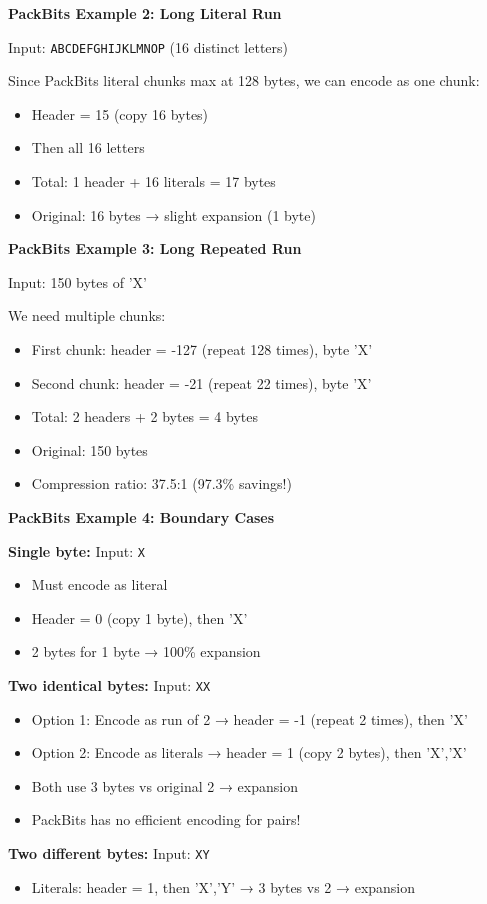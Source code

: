 \begin{examplebox}
\textbf{PackBits Example 2: Long Literal Run}

Input: \texttt{ABCDEFGHIJKLMNOP} (16 distinct letters)

Since PackBits literal chunks max at 128 bytes, we can encode as one chunk:
\begin{itemize}
    \item Header = 15 (copy 16 bytes)
    \item Then all 16 letters
    \item Total: 1 header + 16 literals = 17 bytes
    \item Original: 16 bytes → slight expansion (1 byte)
\end{itemize}
\end{examplebox}

\begin{examplebox}
\textbf{PackBits Example 3: Long Repeated Run}

Input: 150 bytes of 'X'

We need multiple chunks:
\begin{itemize}
    \item First chunk: header = -127 (repeat 128 times), byte 'X'
    \item Second chunk: header = -21 (repeat 22 times), byte 'X'
    \item Total: 2 headers + 2 bytes = 4 bytes
    \item Original: 150 bytes
    \item Compression ratio: 37.5:1 (97.3\% savings!)
\end{itemize}
\end{examplebox}

\begin{examplebox}
\textbf{PackBits Example 4: Boundary Cases}

\textbf{Single byte:} Input: \texttt{X}
\begin{itemize}
    \item Must encode as literal
    \item Header = 0 (copy 1 byte), then 'X'
    \item 2 bytes for 1 byte → 100\% expansion
\end{itemize}

\textbf{Two identical bytes:} Input: \texttt{XX}
\begin{itemize}
    \item Option 1: Encode as run of 2 → header = -1 (repeat 2 times), then 'X'
    \item Option 2: Encode as literals → header = 1 (copy 2 bytes), then 'X','X'
    \item Both use 3 bytes vs original 2 → expansion
    \item PackBits has no efficient encoding for pairs!
\end{itemize}

\textbf{Two different bytes:} Input: \texttt{XY}
\begin{itemize}
    \item Literals: header = 1, then 'X','Y' → 3 bytes vs 2 → expansion
\end{itemize}
\end{examplebox}

